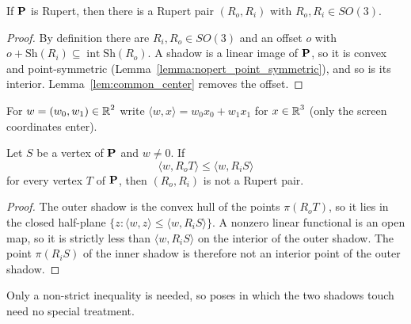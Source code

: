 \begin{lemma}
\label{lem:exists_rup_pair}
\leanok
{}
If $\operatorname{\mathbf{P}}$ is Rupert, then there is a Rupert pair $(R_o, R_i)$ with
$R_o, R_i \in SO(3)$.
\end{lemma}
\begin{proof}
\leanok
By definition there are $R_i, R_o \in SO(3)$ and an offset $o$ with
$o + \mathrm{Sh}(R_i) \subseteq \operatorname{int} \mathrm{Sh}(R_o)$. A shadow is a linear
image of $\operatorname{\mathbf{P}}$, so it is convex and point-symmetric
(Lemma~\ref{lemma:nopert_point_symmetric}), and so is its interior.
Lemma~\ref{lem:common_center} removes the offset.
\end{proof}

For $w = (w_0, w_1) \in \operatorname{\mathbb{R}}^2$ write $\langle w, x \rangle = w_0 x_0 + w_1 x_1$ for
$x \in \operatorname{\mathbb{R}}^3$ (only the screen coordinates enter).

\begin{theorem}
\label{thm:separation}
\leanok
{}
Let $S$ be a vertex of $\operatorname{\mathbf{P}}$ and $w \ne 0$. If
\[
  \langle w, R_o T \rangle \le \langle w, R_i S \rangle
\]
for every vertex $T$ of $\operatorname{\mathbf{P}}$, then $(R_o, R_i)$ is not a Rupert pair.
\end{theorem}
\begin{proof}
\leanok
The outer shadow is the convex hull of the points $\pi(R_o T)$, so it lies in the
closed half-plane $\{ z : \langle w, z \rangle \le \langle w, R_i S \rangle \}$. A nonzero
linear functional is an open map, so it is strictly less than
$\langle w, R_i S \rangle$ on the interior of the outer shadow. The
point $\pi(R_i S)$ of the inner shadow is therefore not an interior point of the outer
shadow.
\end{proof}

Only a non-strict inequality is needed, so poses in which the two shadows touch need
no special treatment.
